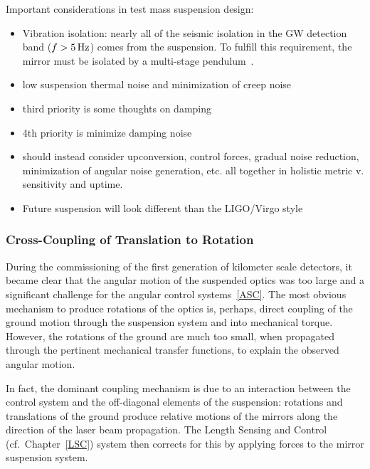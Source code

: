 Important considerations in test mass suspension design\cite{SUS:2012, Aston:2012}:
\begin{itemize}
   \item Vibration isolation: nearly all of the seismic isolation in the GW detection band ($f > 5\,\rm Hz$)
     comes from the suspension. To fulfill this requirement, the mirror must be isolated by a
     multi-stage pendulum~\cite{Beker:2011}.
   \item low suspension thermal noise and minimization of creep noise~\cite{Levin:2012ek, Gretarsson:2005gs}
   \item third priority is some thoughts on damping
   \item 4th priority is minimize damping noise
   \item should instead consider upconversion, control forces, gradual noise
      reduction, minimization of angular noise generation, etc. all together in
      holistic metric v. sensitivity and uptime.
   \item Future suspension will look different than the LIGO/Virgo style
\end{itemize}

\subsubsection{Cross-Coupling of Translation to Rotation}
During the commissioning of the first generation of kilometer scale detectors, it became clear that the angular motion of the suspended optics was too large and a significant challenge for the angular control systems~\ref{ASC}. The most obvious mechanism to produce rotations of the optics is, perhaps, direct coupling of the ground motion through the suspension system and into mechanical torque. However, the rotations of the ground are much too small, when propagated through the pertinent mechanical transfer functions, to explain the observed angular motion.

In fact, the dominant coupling mechanism is due to an interaction between the control system and the off-diagonal elements of the suspension: rotations and translations of the ground produce relative motions of the mirrors along the direction of the laser beam propagation. The Length Sensing and Control (cf.~Chapter~\ref{LSC}) system then corrects for this by applying forces to the mirror suspension system.

